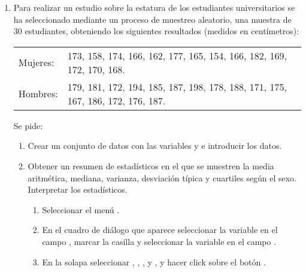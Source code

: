 \begin{enumerate}[leftmargin=*]
\item Para realizar un estudio sobre la estatura de los estudiantes universitarios se ha seleccionado mediante un
proceso de muestreo aleatorio, una muestra de 30 estudiantes, obteniendo los siguientes resultados (medidos en centímetros):
\begin{center}
\begin{tabular}{ll}
Mujeres: & 173, 158, 174, 166, 162, 177, 165, 154, 166, 182, 169, 172, 170, 168. \\
Hombres: & 179, 181, 172, 194, 185, 187, 198, 178, 188, 171, 175, 167, 186, 172, 176, 187. 
\end{tabular}
\end{center}
Se pide:

\begin{enumerate}
\item Crear un conjunto de datos con las variables  y  e introducir los datos.

\item Obtener un resumen de estadísticos en el que se muestren la media aritmética, mediana, varianza,
desviación típica y cuartiles según el sexo. Interpretar los estadísticos.
\begin{indicacion}{
\begin{enumerate}
\item Seleccionar el menú .
\item En el cuadro de diálogo que aparece seleccionar la variable  en el campo ,
marcar la casilla  y seleccionar la variable  en el campo .
\item En la solapa  seleccionar , , ,
 y , y hacer click sobre el botón .
\end{enumerate}}
\end{indicacion}

\end{enumerate}
\end{enumerate}


